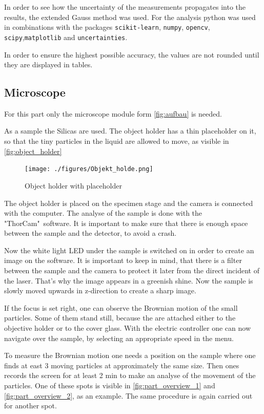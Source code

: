 \documentclass[12pt,english,ngerman]{scrartcl}
\begin{document}
In order to see how the uncertainty of the measurements propagates into the
results, the extended Gauss method was used. For the analysis python was used
in combinations with the packages \verb#scikit-learn#, \verb#numpy#,
\verb#opencv#, \verb#scipy#,\verb#matplotlib# and \verb#uncertainties#.

In order to ensure the highest possible accuracy, the values are not rounded
until they are displayed in tables.

\subsection{Microscope}\label{seq:durchfurung_microscope}

For this part only the microscope module form \autoref{fig:aufbau} is needed.

As a sample the Silicas are used. The object holder has a thin placeholder on
it, so that the tiny particles in the liquid are allowed to move, as visible in
\autoref{fig:object_holder}

\begin{figure}[H]
	\begin{center}
		\texttt{[image: ./figures/Objekt\_holde.png]}
	\end{center}
	\caption[Object holder with placeholder] { Object holder with placeholder
	}\label{fig:object_holder}
\end{figure}

The object holder is placed on the specimen stage and the camera is connected
with the computer. The analyse of the sample is done with the "ThorCam"\
software. It is important to make sure that there is enough space between the
sample and the detector, to avoid a crash.

Now the white light LED under the sample is switched on in order to create an
image on the software. It is important to keep in mind, that there is a filter
between the sample and the camera to protect it later from the direct incident
of the laser. That's why the image appears in a greenish shine. Now the sample
is slowly moved upwards in z-direction to create a sharp image.

If the focus is set right, one can observe the Brownian motion of the small
particles. Some of them stand still, because the are attached either to the
objective holder or to the cover glass. With the electric controller one can
now navigate over the sample, by selecting an appropriate speed in the menu.

To measure the Brownian motion one needs a position on the sample where one
finds at east 3 moving particles at approximately the same size. Then ones
records the screen for at least 2 min to make an analyse of the movement of the
particles. One of these spots is visible in \autoref{fig:part_overview_1} and
\autoref{fig:part_overview_2}, as an example. The same procedure is again
carried out for another spot.
\end{document}
